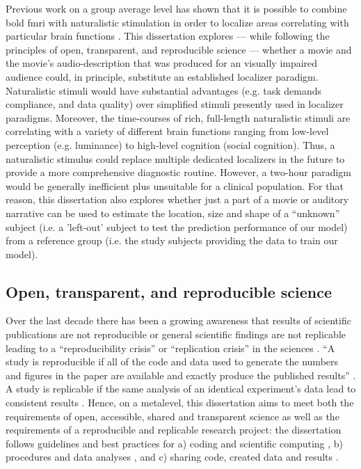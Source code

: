 %
Previous work on a group average level has shown that it is possible to combine
\ac{bold} \ac{fmri} with naturalistic stimulation in order to localize areas
correlating with particular brain functions \citep{bartels2004mapping}.
%
This dissertation explores --- while following the principles of open,
transparent, and reproducible science --- whether a movie and the movie's
audio-description that was produced for an visually impaired audience could, in
principle, substitute an established localizer paradigm.
%
Naturalistic stimuli would have substantial advantages (e.g. task demands
compliance, and data quality) over simplified stimuli presently used in
localizer paradigms.
%
Moreover, the time-courses of rich, full-length naturalistic stimuli are
correlating with a variety of different brain functions ranging from low-level
perception (e.g.  luminance) to high-level cognition (social cognition).
%
Thus, a naturalistic stimulus could replace multiple dedicated localizers in the
future to provide a more comprehensive diagnostic routine.
%
However, a two-hour paradigm would be generally inefficient plus unsuitable for
a clinical population.
%
For that reason, this dissertation also explores whether just a part of a movie
or auditory narrative can be used to estimate the location, size and shape of a
``unknown'' subject (i.e. a 'left-out' subject to test the prediction
performance of our model) from a reference group (i.e. the study subjects
providing the data to train our model).


\subsection{Open, transparent, and reproducible science}

Over the last decade there has been a growing awareness that results of
scientific publications are not reproducible or general scientific findings are
not replicable leading to a ``reproducibility crisis'' or ``replication crisis''
in the sciences \citep{baker2016reproducibility, plesser2018reproducibility,
stupple2019reproducibility, nosek2022replicability}.
``A study is reproducible if all of the code and data used to generate the
numbers and figures in the paper are available and exactly produce the published
results'' \citep{leek2017most}.
A study is replicable if the same analysis of an identical experiment's data
lead to consistent results \citep{dubois2016building, leek2017most}.
%
Hence, on a metalevel, this dissertation aims to meet both the requirements of
open, accessible, shared and transparent science \citep{watson2015will,
fecher2014open} as well as the requirements of a reproducible and replicable
research project:
%
the dissertation follows guidelines and best practices for a) coding and
scientific computing \citep{wilson2014best}, b) procedures and data analyses
\citep{nichols2017best, poldrack2017scanning, poldrack2019establishment}, and c)
sharing code, created data and results \citep{eglen2017toward, nichols2017best,
pernet2015improving}.



